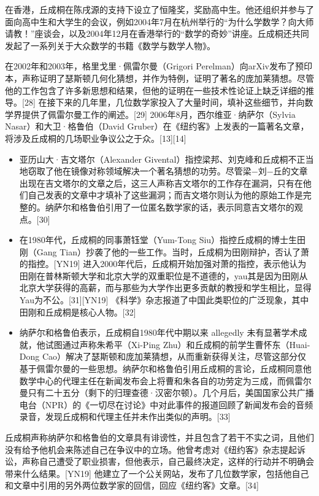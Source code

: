 在香港，丘成桐在陈戌源的支持下设立了恒隆奖，奖励高中生。他还组织并参与了面向高中生和大学生的会议，例如2004年7月在杭州举行的“为什么学数学？向大师请教！”座谈会，以及2004年12月在香港举行的“数学的奇妙”讲座。丘成桐还共同发起了一系列关于大众数学的书籍《数学与数学人物》。

在2002年和2003年，格里戈里·佩雷尔曼（Grigori Perelman）向arXiv发布了预印本，声称证明了瑟斯顿几何化猜想，并作为特例，证明了著名的庞加莱猜想。尽管他的工作包含了许多新思想和结果，但他的证明在一些技术性论证上缺乏详细的推导。[28] 在接下来的几年里，几位数学家投入了大量时间，填补这些细节，并向数学界提供了佩雷尔曼工作的阐述。[29] 2006年8月，西尔维亚·纳萨尔（Sylvia Nasar）和大卫·格鲁伯（David Gruber）在《纽约客》上发表的一篇著名文章，将涉及丘成桐的几场职业争议公之于众。[13][14]
\begin{itemize}
\item 亚历山大·吉文塔尔（Alexander Givental）指控梁邦、刘克峰和丘成桐不正当地窃取了他在镜像对称领域解决一个著名猜想的功劳。尽管梁−刘−丘的文章出现在吉文塔尔的文章之后，这三人声称吉文塔尔的工作存在漏洞，只有在他们自己发表的文章中才填补了这些漏洞；而吉文塔尔则认为他的原始工作是完整的。纳萨尔和格鲁伯引用了一位匿名数学家的话，表示同意吉文塔尔的观点。[30]  
\item 在1980年代，丘成桐的同事萧钰堂（Yum-Tong Siu）指控丘成桐的博士生田刚（Gang Tian）抄袭了他的一些工作。当时，丘成桐为田刚辩护，否认了萧的指控。[YN19] 进入2000年代后，丘成桐开始加强对萧的指控，表示他认为田刚在普林斯顿大学和北京大学的双重职位是不道德的，yau其是因为田刚从北京大学获得的高薪，而与那些为大学作出更多贡献的教授和学生相比，显得Yau为不公。[31][YN19] 《科学》杂志报道了中国此类职位的广泛现象，其中田刚和丘成桐是核心人物。[32]  
\item 纳萨尔和格鲁伯表示，丘成桐自1980年代中期以来 allegedly 未有显著学术成就，他试图通过声称朱希平（Xi-Ping Zhu）和丘成桐的前学生曹怀东（Huai-Dong Cao）解决了瑟斯顿和庞加莱猜想，从而重新获得关注，尽管这部分仅基于佩雷尔曼的一些思想。纳萨尔和格鲁伯引用丘成桐的言论，丘成桐同意他数学中心的代理主任在新闻发布会上将曹和朱各自的功劳定为三成，而佩雷尔曼只有二十五分（剩下的归理查德·汉密尔顿）。几个月后，美国国家公共广播电台（NPR）的《一切尽在讨论》中对此事件的报道回顾了新闻发布会的音频录音，发现丘成桐和代理主任并未作出类似的声明。[33]
\end{itemize}
丘成桐声称纳萨尔和格鲁伯的文章具有诽谤性，并且包含了若干不实之词，且他们没有给予他机会来陈述自己在争议中的立场。他曾考虑对《纽约客》杂志提起诉讼，声称自己遭受了职业损害，但他表示，自己最终决定，这样的行动并不明确会带来什么结果。[YN19] 他建立了一个公关网站，发布了几位数学家，包括他自己和文章中引用的另外两位数学家的回信，回应《纽约客》文章。[34]

